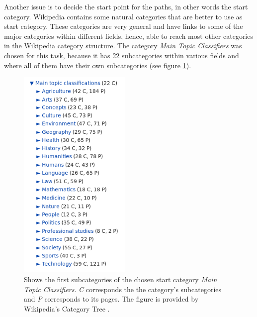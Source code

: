 Another issue is to decide the start point for the paths, in other words the start category. Wikipedia contains some natural categories that are better to use as start category. These categories are very general and have links to some of the major categories within different fields, hence, able to reach most other categories in the Wikipedia category structure. The category \emph{Main Topic Classifiers} was chosen for this task, because it has 22 subcategories within various fields and  where all of them have their own subcategories (see figure \ref{fig:mainclassifiers})\cite{wiki:specialtree}.

\begin{figure}[h]
\begin{center}
\includegraphics[width=0.48\textwidth]{Chapters/Implementation/Maintopicclassifiers.png}
\end{center}
\caption[Subcategories of \emph{Main Topic Classifiers}]{Shows the first subcategories of the chosen start category \emph{Main Topic Classifiers}. \emph{C} corresponds the the category's subcategories and \emph{P} corresponds to its pages. The figure is provided by Wikipedia's Category Tree \cite{wiki:specialtree}.}
\vspace{-20pt}
\label{fig:mainclassifiers}
\end{figure}


